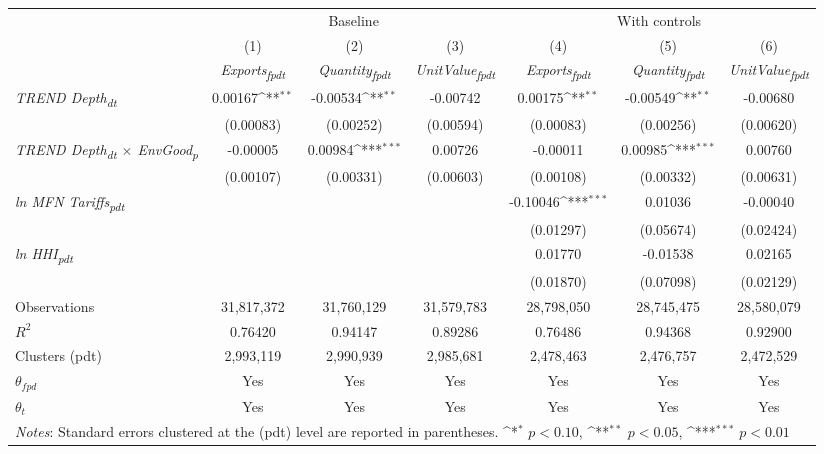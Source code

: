 {
\def\sym#1{\ifmmode^{#1}\else\(^{#1}\)\fi}
\begin{tabular}{l*{6}{c}}
\toprule
&\multicolumn{3}{c}{Baseline}&\multicolumn{3}{c}{With controls}\\\cmidrule(lr){2-4}\cmidrule(lr){5-7}
&(1)&(2)&(3)&(4)&(5)&(6)\\
&\textit{Exports\textsubscript{fpdt}}&\textit{Quantity\textsubscript{fpdt}}&\textit{UnitValue\textsubscript{fpdt}}&\textit{Exports\textsubscript{fpdt}}&\textit{Quantity\textsubscript{fpdt}}&\textit{UnitValue\textsubscript{fpdt}}\\
\midrule
\textit{TREND Depth\textsubscript{dt}} & 0.00167\sym{**} & -0.00534\sym{**} & -0.00742 & 0.00175\sym{**} & -0.00549\sym{**} & -0.00680\\
 & (0.00083) & (0.00252) & (0.00594) & (0.00083) & (0.00256) & (0.00620)\\
\addlinespace
\textit{TREND Depth\textsubscript{dt} $\times$ EnvGood\textsubscript{p}} & -0.00005 & 0.00984\sym{***} & 0.00726 & -0.00011 & 0.00985\sym{***} & 0.00760\\
 & (0.00107) & (0.00331) & (0.00603) & (0.00108) & (0.00332) & (0.00631)\\
\addlinespace
\textit{ln MFN Tariffs\textsubscript{pdt}} &  &  &  & -0.10046\sym{***} & 0.01036 & -0.00040\\
 &  &  &  & (0.01297) & (0.05674) & (0.02424)\\
\addlinespace
\textit{ln HHI\textsubscript{pdt}} &  &  &  & 0.01770 & -0.01538 & 0.02165\\
 &  &  &  & (0.01870) & (0.07098) & (0.02129)\\
\midrule
Observations & 31,817,372 & 31,760,129 & 31,579,783 & 28,798,050 & 28,745,475 & 28,580,079\\
$R^{2}$ & 0.76420 & 0.94147 & 0.89286 & 0.76486 & 0.94368 & 0.92900\\
Clusters (pdt) & 2,993,119 & 2,990,939 & 2,985,681 & 2,478,463 & 2,476,757 & 2,472,529\\
$\theta_{fpd}$ & Yes & Yes & Yes & Yes & Yes & Yes\\
$\theta_{t}$ & Yes & Yes & Yes & Yes & Yes & Yes\\
\bottomrule
\multicolumn{7}{l}{\footnotesize \textit{Notes}: Standard errors clustered at the (pdt) level are reported in parentheses. \sym{*} \(p<0.10\), \sym{**} \(p<0.05\), \sym{***} \(p<0.01\)}\\
\end{tabular}
}
